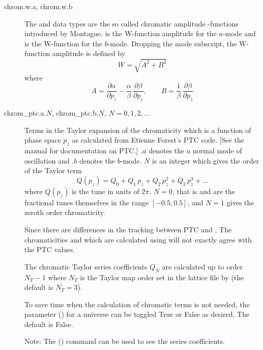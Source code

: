 \begin{description}
  \item[chrom.w.a, chrom.w.b] \Newline {}
The  and  data types are the so called chromatic amplitude
-functions introduced by Montague\cite{b:w}.  is the W-function amplitude for
the $a$-mode and  is the W-function for the $b$-mode. Dropping the mode subscript,
the W-function amplitude is defined by 
\begin{equation}
  W = \sqrt{A^2 + B^2}
\end{equation}
where
\begin{equation}
  A = \frac{\partial\alpha}{\partial p_z} - \frac{\alpha}{\beta} \, \frac{\partial\beta}{\partial p_z},
  \qquad
  B = \frac{1}{\beta} \, \frac{\partial\beta}{\partial p_z}
\end{equation}

  \item[chrom_ptc.a.$N$, chrom_ptc.b.$N$, $N = 0, 1, 2, \ldots$] \Newline {}
Terms in the Taylor expansion of the chromaticity which is a function of phase space $p_z$ as
calculated from Etienne Forest's PTC code. [See the \bmad manual for documentation on PTC.] $.a$
denotes the $a$ normal mode of oscillation and $.b$ denotes the $b$-mode. $N$ is an integer which
gives the order of the Taylor term
\begin{equation}
  Q(p_z) = Q_0 + Q_1 \, p_z + Q_2 \, p_z^2 + Q_3 \, p_z^3 + \ldots
\end{equation}
where $Q(p_z)$ is the tune in units of $2\pi$.  $N = 0$, that is  and
 are the fractional tunes themselves in the range $[-0.5, 0.5]$, and $N = 1$ gives
the zeroth order chromaticity.

Since there are differences in the tracking between PTC and \bmad, The chromaticities  and
 which are calculated using \bmad will not exactly agree with the PTC values.

The chromatic Taylor series coefficients $Q_N$ are calculated up to order $N_T-1$ where $N_T$ is the
Taylor map order set in the lattice file by  (the default is $N_T=3$). 

To save time when the calculation of chromatic terms is not needed, the  parameter
() for a universe can be toggled True or False as desired. The default is False.

Note: The  () command can be used to see the series coefficients.


\end{description}
